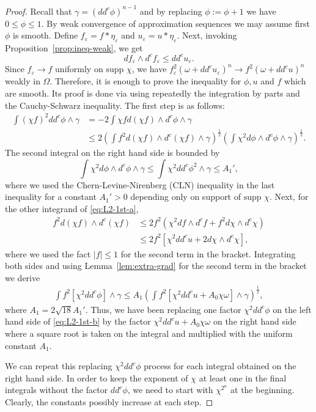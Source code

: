 \documentclass{amsart}
\newcommand{\veps}{\varepsilon}
\newcommand{\ga}{\gamma}
\newcommand{\om}{\omega}
\newcommand{\Om}{\Omega}
\newcommand{\supp}{\mbox{supp }}
\theoremstyle{definition}
\numberwithin{thm}{section}
\numberwithin{equation}{section}
\renewcommand{\[}{\begin{equation}}
\renewcommand{\]}{\end{equation}}
\newcommand{\wed}{\wedge}
\begin{document}
\begin{proof} Recall that $\ga= (dd^c\phi)^{n-1}$ and by replacing $\phi :=\phi+1$ we have $0\leq \phi \leq 1$. By weak convergence of approximation sequences we may assume first $\phi$ is smooth. Define $f_\veps = f*\eta_\veps$ and $u_\veps= u*\eta_\veps$.  Next, invoking Proposition~\ref{prop:ineq-weak}, we get
$$
	d f_\veps \wed d^c f_\veps \leq dd^c u_\veps.
$$
Since $f_\veps \to f$ uniformly on $\supp \chi$, we have $f_\veps^2 (\om+dd^c u_\veps)^n \to f^2 (\om+dd^cu)^n$ weakly in $\Om$.  Therefore, it is enough to prove the inequality for $\phi, u$ and $f$ which are smooth. Its proof is done via using repeatedly the integration by parts and the Cauchy-Schwarz inequality. The first step  is as follows:
\[\label{eq:L2-1st-a}\begin{aligned}
	\int (\chi f)^2 dd^c\phi \wed\ga
&=-2 \int \chi f d(\chi f) \wed d^c \phi \wed\ga \\
&\leq  2\left(\int f^2 d(\chi f) \wed d^c(\chi f) \wed \ga \right)^\frac{1}{2}\left( \int \chi^2 d\phi \wed d^c\phi \wed \ga\right)^\frac{1}{2}.
\end{aligned}\]
The second integral on the right hand side  is bounded by
$$	
	 \int \chi^2 d\phi \wed d^c\phi \wed \ga \leq \int \chi^2 dd^c\phi^2 \wed \ga \leq A_1',
$$
 where we used the Chern-Levine-Nirenberg (CLN) inequality in the last  inequality for    a constant $A_1'>0$ depending only on support of $\supp \chi$. Next, for the other integrand of \eqref{eq:L2-1st-a},
$$\begin{aligned}
	f^2 d(\chi f) \wed d^c (\chi f) 
&\leq 2 f^2 (\chi^2 df \wed d^c f + f^2 d\chi \wed d^c\chi) \\
&\leq 2 f^2[\chi^2 dd^c u +2 d\chi \wed d^c\chi],
\end{aligned}$$
where we used the fact $|f|\leq 1$ for the second term in the bracket. Integrating both sides and 
using Lemma~\ref{lem:extra-grad} for the second term in the bracket  we derive
\[\label{eq:L2-1st-b}\begin{aligned}
	\int f^2 [\chi^2 dd^c\phi ]\wed\ga  \leq A_1 \left( \int  f^2 [ \chi^2  dd^c u + A_0 \chi \om]  \wed \ga\right)^\frac{1}{2},
\end{aligned}\]
where $A_1 = 2\sqrt{18} A_1'$.
Thus, we have been replacing one factor $\chi^2 dd^c \phi$ on the left hand side of \eqref{eq:L2-1st-b} by the factor $\chi^2 dd^c u + A_0 \chi \om $ on the right hand side where a square root is taken on the integral and multiplied with the uniform constant $A_1$.

We can repeat this replacing $\chi^2 dd^c \phi$ process for each  integral obtained on the right hand side. In order to keep the exponent of $\chi$ at least one in the final integrals without the factor $dd^c \phi$, we need to start with  $\chi^{2^n}$ at the beginning. Clearly, the constants possibly increase at each step.  


\end{proof}
\end{document}
